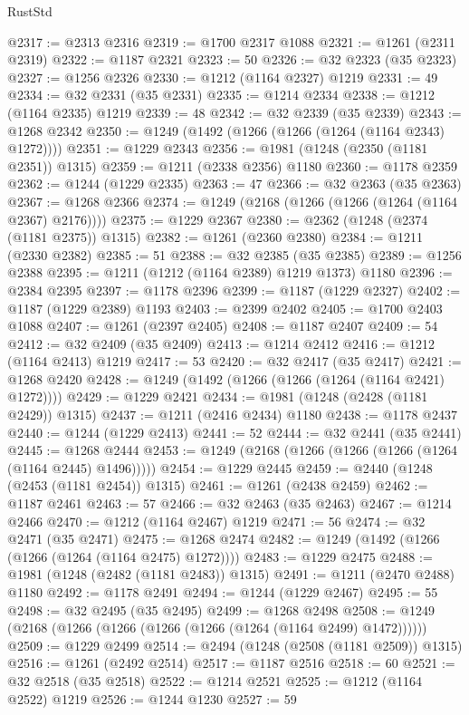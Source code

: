 \begin{lexlean}{RustStd}
\begin{coremodule}
@2317 := @2313 @2316
@2319 := @1700 @2317 @1088
@2321 := @1261 (@2311 @2319)
@2322 := @1187 @2321
@2323 := 50
@2326 := @32 @2323 (@35 @2323)
@2327 := @1256 @2326
@2330 := @1212 (@1164 @2327) @1219
@2331 := 49
@2334 := @32 @2331 (@35 @2331)
@2335 := @1214 @2334
@2338 := @1212 (@1164 @2335) @1219
@2339 := 48
@2342 := @32 @2339 (@35 @2339)
@2343 := @1268 @2342
@2350 := @1249 (@1492 (@1266 (@1266 (@1264 (@1164 @2343) @1272))))
@2351 := @1229 @2343
@2356 := @1981 (@1248 (@2350 (@1181 @2351)) @1315)
@2359 := @1211 (@2338 @2356) @1180
@2360 := @1178 @2359
@2362 := @1244 (@1229 @2335)
@2363 := 47
@2366 := @32 @2363 (@35 @2363)
@2367 := @1268 @2366
@2374 := @1249 (@2168 (@1266 (@1266 (@1264 (@1164 @2367) @2176))))
@2375 := @1229 @2367
@2380 := @2362 (@1248 (@2374 (@1181 @2375)) @1315)
@2382 := @1261 (@2360 @2380)
@2384 := @1211 (@2330 @2382)
@2385 := 51
@2388 := @32 @2385 (@35 @2385)
@2389 := @1256 @2388
@2395 := @1211 (@1212 (@1164 @2389) @1219 @1373) @1180
@2396 := @2384 @2395
@2397 := @1178 @2396
@2399 := @1187 (@1229 @2327)
@2402 := @1187 (@1229 @2389) @1193
@2403 := @2399 @2402
@2405 := @1700 @2403 @1088
@2407 := @1261 (@2397 @2405)
@2408 := @1187 @2407
@2409 := 54
@2412 := @32 @2409 (@35 @2409)
@2413 := @1214 @2412
@2416 := @1212 (@1164 @2413) @1219
@2417 := 53
@2420 := @32 @2417 (@35 @2417)
@2421 := @1268 @2420
@2428 := @1249 (@1492 (@1266 (@1266 (@1264 (@1164 @2421) @1272))))
@2429 := @1229 @2421
@2434 := @1981 (@1248 (@2428 (@1181 @2429)) @1315)
@2437 := @1211 (@2416 @2434) @1180
@2438 := @1178 @2437
@2440 := @1244 (@1229 @2413)
@2441 := 52
@2444 := @32 @2441 (@35 @2441)
@2445 := @1268 @2444
@2453 := @1249 (@2168 (@1266 (@1266 (@1266 (@1264 (@1164 @2445) @1496)))))
@2454 := @1229 @2445
@2459 := @2440 (@1248 (@2453 (@1181 @2454)) @1315)
@2461 := @1261 (@2438 @2459)
@2462 := @1187 @2461
@2463 := 57
@2466 := @32 @2463 (@35 @2463)
@2467 := @1214 @2466
@2470 := @1212 (@1164 @2467) @1219
@2471 := 56
@2474 := @32 @2471 (@35 @2471)
@2475 := @1268 @2474
@2482 := @1249 (@1492 (@1266 (@1266 (@1264 (@1164 @2475) @1272))))
@2483 := @1229 @2475
@2488 := @1981 (@1248 (@2482 (@1181 @2483)) @1315)
@2491 := @1211 (@2470 @2488) @1180
@2492 := @1178 @2491
@2494 := @1244 (@1229 @2467)
@2495 := 55
@2498 := @32 @2495 (@35 @2495)
@2499 := @1268 @2498
@2508 := @1249 (@2168 (@1266 (@1266 (@1266 (@1266 (@1264 (@1164 @2499) @1472))))))
@2509 := @1229 @2499
@2514 := @2494 (@1248 (@2508 (@1181 @2509)) @1315)
@2516 := @1261 (@2492 @2514)
@2517 := @1187 @2516
@2518 := 60
@2521 := @32 @2518 (@35 @2518)
@2522 := @1214 @2521
@2525 := @1212 (@1164 @2522) @1219
@2526 := @1244 @1230
@2527 := 59

\end{coremodule}
\end{lexlean}
